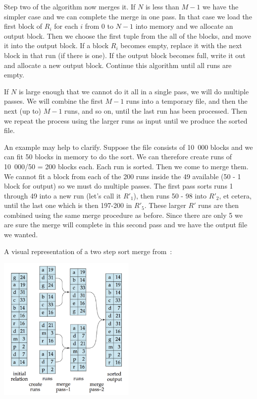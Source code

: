 Step two of the algorithm now merges it. If $N$ is less than $M-1$ we have the simpler case and we can complete the merge in one pass. In that case we load the first block of $R_{i}$ for each $i$ from $0$ to $N-1$ into memory and we allocate an output block. Then we choose the first tuple from the all of the blocks, and move it into the output block. If a block $R_{i}$ becomes empty, replace it with the next block in that run (if there is one). If the output block becomes full, write it out and allocate a new output block. Continue this algorithm until all runs are empty. 

If $N$ is large enough that we cannot do it all in a single pass, we will do multiple passes. We will combine the first $M-1$ runs into a temporary file, and then the next (up to) $M-1$ runs, and so on, until the last run has been processed. Then we repeat the process using the larger runs as input until we produce the sorted file.

An example may help to clarify. Suppose the file consists of 10~000 blocks and we can fit 50 blocks in memory to do the sort. We can therefore create runs of 10~000/50 = 200 blocks each. Each run is sorted. Then we come to merge them. We cannot fit a block from each of the 200 runs inside the 49 available (50 - 1 block for output) so we must do multiple passes. The first pass sorts runs 1 through 49 into a new run (let's call it $R'_{1}$), then runs 50 - 98 into $R'_{2}$, et cetera, until the last one which is then 197-200 in $R'_{5}$. These larger $R'$ runs are then combined using the same merge procedure as before. Since there are only 5 we are sure the merge will complete in this second pass and we have the output file we wanted.

A visual representation of a two step sort merge from~\cite{dsc}:

\begin{center}
	\includegraphics[width=0.5\textwidth]{images/external-merge}
\end{center}

